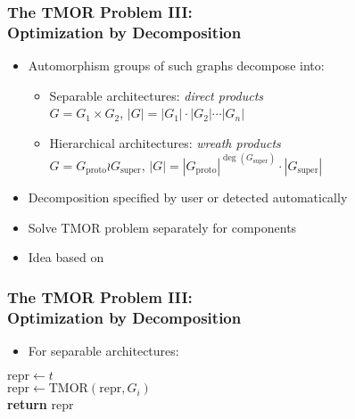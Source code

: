 \documentclass{beamer}
\begin{document}
\begin{frame}
  \frametitle{The TMOR Problem III:\\Optimization by Decomposition}

  \begin{itemize}
    \setlength\itemsep{.25cm}

    \item<1-> Automorphism groups of such graphs decompose into:
      \begin{itemize}
        \setlength\itemsep{.25cm}

        \item<2-> Separable architectures: \textit{direct products}\\
              $G = G_1 \times G_2$, $|G| = |G_1| \cdot |G_2| \cdots |G_n|$
        \item<3-> Hierarchical architectures: \textit{wreath products}\\
              $G = G_{\mathrm{proto}} \wr G_{\mathrm{super}}$,
              $|G| = |G_{\mathrm{proto}}|^{\operatorname{deg}(G_{\mathrm{super}})}
               \cdot |G_{\mathrm{super}}|$
      \end{itemize}
    \item<4-> Decomposition specified by user or detected automatically
    \item<5-> Solve TMOR problem separately for components
    \item<6-> Idea based on~\cite{Donaldson}
  \end{itemize}
\end{frame}

\begin{frame}
  \frametitle{The TMOR Problem III:\\Optimization by Decomposition}

  \begin{itemize}
    \item For separable architectures:
  \end{itemize}

  \vspace{.25cm}

  \begin{algorithmic}[1]
      \State $\mathrm{repr} \gets t$
      \\
        \State $\mathrm{repr} \gets \mathrm{TMOR}(\mathrm{repr}, G_i)$
      \EndFor
      \\
      \State \textbf{return} $\mathrm{repr}$
    \EndProcedure
  \end{algorithmic}
\end{frame}
\end{document}

